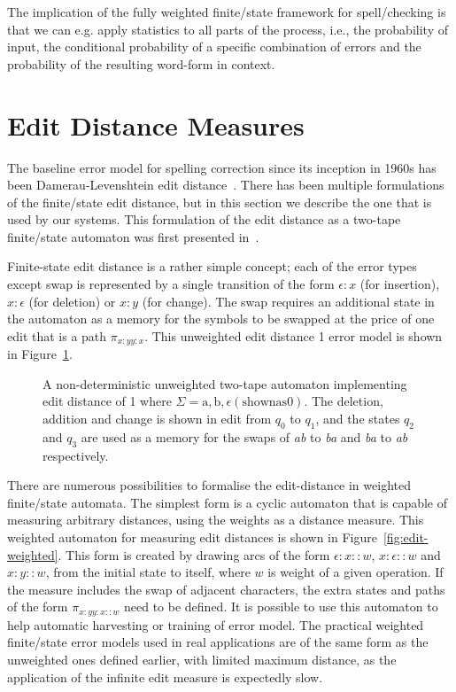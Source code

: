 \documentclass[officiallayout]{unihelcompling}
\begin{document}
The implication of the fully weighted finite\-/state framework for
spell\-/checking is that we can e.g. apply statistics to all parts of the
process, i.e., the probability of input, the conditional probability of a
specific combination of errors and the probability of the resulting word-form
in context. 

\section{Edit Distance Measures}
\label{sec:edit-distance}

The baseline error model for spelling correction since its inception in 1960s
has been Damerau-Levenshtein edit
distance~\citep{damerau1964technique,levenshtein1966binary}. There has been
multiple formulations of the finite\-/state edit distance, but in this section
we describe the one that is used by our systems. This formulation of the edit
distance as a two-tape finite\-/state automaton was first presented
in~\citet{schulz2002fast}.

Finite-state edit distance is a rather simple concept; each of the error types
except swap is represented by a single transition of the form $\epsilon:x$ (for
insertion), $x:\epsilon$ (for deletion) or $x:y$ (for change). The swap
requires an additional state in the automaton as a memory for the symbols to be
swapped at the price of one edit that is a path $\pi_{x:y y:x}$. This
unweighted edit distance 1 error model is shown in Figure~\ref{fig:edit1-ab}.

\begin{figure}
    \caption{A non-deterministic unweighted two-tape automaton implementing
        edit distance of 1 where $\Sigma = {\mathrm{a}, \mathrm{b}, \epsilon
        \mathrm{(shown as 0)}}$. The deletion, addition and change is shown in
        edit from $q_0$ to $q_1$, and the states $q_2$ and $q_3$ are used as a
        memory for the swaps of \emph{ab} to \emph{ba} and \emph{ba} to
        \emph{ab} respectively.  \label{fig:edit1-ab}}
\end{figure}

There are numerous possibilities to formalise the edit-distance in weighted
finite\-/state automata. The simplest form is a cyclic automaton that is
capable of measuring arbitrary distances, using the weights as a distance
measure. This weighted automaton for measuring edit distances is shown in
Figure~\ref{fig:edit-weighted}. This form is created by drawing arcs of the
form $\epsilon:x::w$, $x:\epsilon::w$ and $x:y::w$, from the initial state to
itself, where $w$ is weight of a given operation. If the measure includes the
swap of adjacent characters, the extra states and paths of the form $\pi_{x:y
y:x::w}$ need to be defined. It is possible to use this automaton to help
automatic harvesting or training of error model. The practical weighted
finite\-/state error models used in real applications are of the same form as
the unweighted ones defined earlier, with limited maximum distance, as the
application of the infinite edit measure is expectedly slow.
\end{document}
